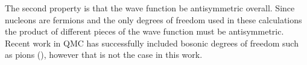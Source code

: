 The second property is that the wave function be antisymmetric overall. Since nucleons are fermions and the only degrees of freedom used in these calculations the product of different pieces of the wave function must be antisymmetric. Recent work in QMC has successfully included bosonic degrees of freedom such as pions (\cite{madeira2018}), however that is not the case in this work.


